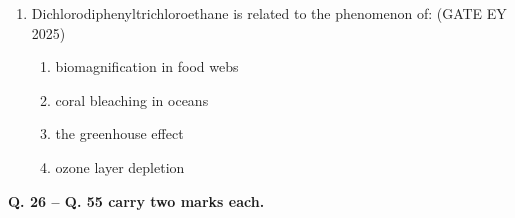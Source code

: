 \begin{enumerate}[leftmargin=*,label=\textbf{Q.\arabic*},resume]
\item Dichlorodiphenyltrichloroethane is related to the phenomenon of: \hfill {(GATE EY 2025)}
\begin{multicols}{2}
\begin{enumerate}
\item biomagnification in food webs
\item coral bleaching in oceans
\item the greenhouse effect
\item ozone layer depletion
\end{enumerate}
\end{multicols}

\end{enumerate}
\newpage
{}

\noindent \textbf{Q. 26 -- Q. 55 carry two marks each.}

